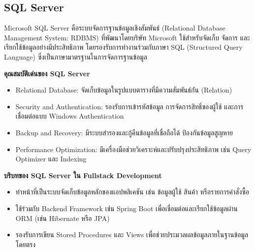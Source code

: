 \subsection{SQL Server}
Microsoft SQL Server คือระบบจัดการฐานข้อมูลเชิงสัมพันธ์ (Relational Database Management System: RDBMS) 
ที่พัฒนาโดยบริษัท Microsoft ใช้สำหรับจัดเก็บ จัดการ และเรียกใช้ข้อมูลอย่างมีประสิทธิภาพ 
โดยรองรับการทำงานร่วมกับภาษา SQL (Structured Query Language) ซึ่งเป็นภาษามาตรฐานในการจัดการฐานข้อมูล\

\textbf{คุณสมบัติเด่นของ SQL Server}
\begin{itemize}
    \item Relational Database: จัดเก็บข้อมูลในรูปแบบตารางที่มีความสัมพันธ์กัน (Relation) 
    \item Security and Authentication: รองรับการเข้ารหัสข้อมูล การจัดการสิทธิ์ของผู้ใช้ และการเชื่อมต่อแบบ Windows Authentication
    \item Backup and Recovery: มีระบบสำรองและกู้คืนข้อมูลที่เชื่อถือได้ ป้องกันข้อมูลสูญหาย
    \item Performance Optimization: มีเครื่องมือช่วยวิเคราะห์และปรับปรุงประสิทธิภาพ เช่น Query Optimizer และ Indexing
\end{itemize}

\textbf{บริบทของ SQL Server ใน Fullstack Development}
\begin{itemize}
    \item ทำหน้าที่เป็นระบบจัดเก็บข้อมูลหลักของแอปพลิเคชัน เช่น ข้อมูลผู้ใช้ สินค้า หรือรายการคำสั่งซื้อ
    \item ใช้ร่วมกับ Backend Framework เช่น Spring Boot เพื่อเชื่อมต่อและเรียกใช้ข้อมูลผ่าน ORM (เช่น Hibernate หรือ JPA)
    \item รองรับการเขียน Stored Procedures และ Views เพื่อช่วยประมวลผลข้อมูลภายในฐานข้อมูลโดยตรง
\end{itemize}